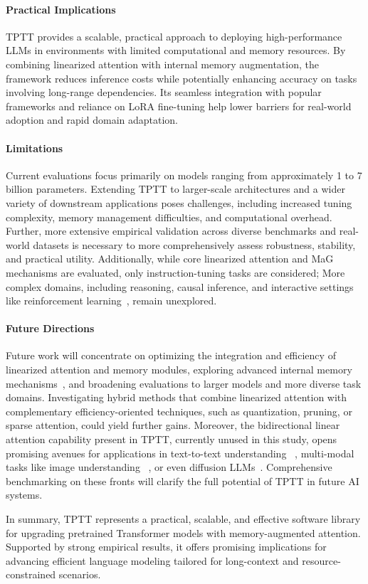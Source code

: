 \documentclass[10pt,a4paper]{article}
\begin{document}
\paragraph{Practical Implications}  
TPTT provides a scalable, practical approach to deploying high-performance LLMs in environments with limited computational and memory resources. By combining linearized attention with internal memory augmentation, the framework reduces inference costs while potentially enhancing accuracy on tasks involving long-range dependencies. Its seamless integration with popular frameworks and reliance on LoRA fine-tuning help lower barriers for real-world adoption and rapid domain adaptation.

\paragraph{Limitations}  
Current evaluations focus primarily on models ranging from approximately 1 to 7 billion parameters. Extending TPTT to larger-scale architectures and a wider variety of downstream applications poses challenges, including increased tuning complexity, memory management difficulties, and computational overhead. Further, more extensive empirical validation across diverse benchmarks and real-world datasets is necessary to more comprehensively assess robustness, stability, and practical utility. Additionally, while core linearized attention and MaG mechanisms are evaluated, only instruction-tuning tasks are considered; More complex domains, including reasoning, causal inference, and interactive settings like reinforcement learning~\cite{shao2024deepseekmath}, remain unexplored.

\paragraph{Future Directions}  
Future work will concentrate on optimizing the integration and efficiency of linearized attention and memory modules, exploring advanced internal memory mechanisms~\cite{behrouz2025s}, and broadening evaluations to larger models and more diverse task domains. Investigating hybrid methods that combine linearized attention with complementary efficiency-oriented techniques, such as quantization, pruning, or sparse attention, could yield further gains. Moreover, the bidirectional linear attention capability present in TPTT, currently unused in this study, opens promising avenues for applications in text-to-text understanding ~\cite{devlin2019bert}, multi-modal tasks like image understanding ~\cite{dosovitskiy2020image}, or even diffusion LLMs~\cite{ye2025dream}. Comprehensive benchmarking on these fronts will clarify the full potential of TPTT in future AI systems.

In summary, TPTT represents a practical, scalable, and effective software library for upgrading pretrained Transformer models with memory-augmented attention. Supported by strong empirical results, it offers promising implications for advancing efficient language modeling tailored for long-context and resource-constrained scenarios.




\end{document}
